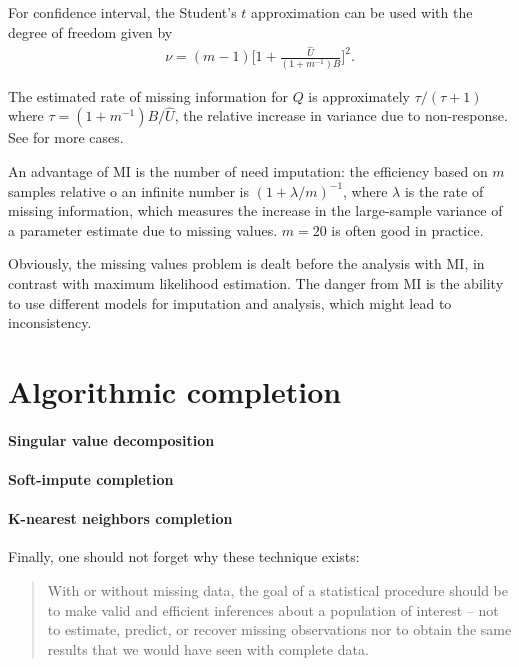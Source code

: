 For confidence interval, the Student's $t$ approximation can be used with the
degree of freedom given by
\begin{align*}
\nu = (m-1)\Big[1 + \frac{\hat U}{(1 + m^{-1})B} \Big]^2.
\end{align*}

The estimated rate of missing information for $Q$ is approximately
$\tau/(\tau+1)$ where $\tau = (1 + m^{-1})B/\hat U$, the relative increase in
variance due to non-response. See \cite{schafer1997analysis} for more cases.

An advantage of MI is the number of need imputation: the efficiency based on
$m$ samples relative o an infinite number is $(1 + \lambda/m)^{-1}$, where
$\lambda$ is the rate of missing information, which measures the increase in
the large-sample variance of a parameter estimate due to missing values. $m=20$
is often good in practice.

Obviously, the missing values problem is dealt before the analysis with MI, in
contrast with maximum likelihood estimation. The danger from MI is the ability
to use different models for imputation and analysis, which might lead to
inconsistency.

\section{Algorithmic completion}
\label{sec:compl-case}

\paragraph{Singular value decomposition}

\paragraph{Soft-impute completion}
\paragraph{K-nearest neighbors completion}

Finally, one should not forget why these technique exists:

\begin{quote}
  With or without missing data, the goal of a statistical procedure should be
  to make valid and efficient inferences about a population of interest -- not to
  estimate, predict, or recover missing observations nor to obtain the same
  results that we would have seen with complete data. \cite{schafer2002missing}
\end{quote}


